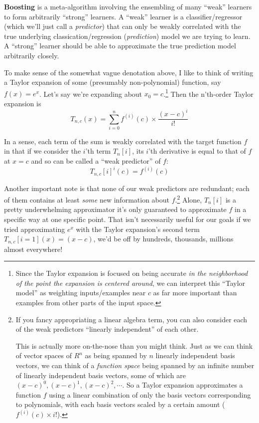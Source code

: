 \documentclass[letterpaper,12pt]{report}
\begin{document}
\textbf{Boosting} is a meta-algorithm involving
the ensembling of many ``weak'' learners to form arbitrarily ``strong'' learners.
A ``weak'' learner is a classifier/regressor (which we'll just call a \emph{predictor}) 
that can only be weakly correlated with the true underlying 
classication/regression (\emph{prediction}) model we are trying to 
learn. A ``strong'' learner should be able to approximate the true prediction model
arbitrarily closely.

To make sense of the somewhat vague denotation above, 
I like to think of writing a Taylor expansion of some (presumably non-polynomial)
function, say \(f(x) = e^x\). Let's say we're expanding about \(x_0 = c\).\footnote{
  Since the Taylor expansion is focused on being accurate
  \emph{in the neighborhood of the point the expansion is centered around}, 
  we can interpret this ``Taylor model'' as weighting inputs/examples near \(c\) 
  as far more important than examples from other parts of the input space.
} 
Then the n'th-order Taylor expansion is
\[ T_{n,c}(x) = \sum_{i=0}^{n} f^{(i)}(c) \times \frac{(x-c)^i}{i!}\]

In a sense, each term of the sum is weakly correlated with the target function $f$ in that
if we consider the \(i\)'th term \(T_n[i]\), its \(i\)'th derivative is equal to 
that of \(f\) at \(x = c\) and so can be called a ``weak predictor'' of \(f\):
\[T_{n,c}[i]^{{i}}(c) = f^{(i)}(c) \]

Another important note is that none of our weak predictors are redundant; each of them
contains at least \emph{some} new information about \(f\).\footnote{
  If you fancy appropriating a linear algebra term, you can also consider each of the weak
  predictors ``linearly independent'' of each other. 

  This is actually more on-the-nose than
  you might think. Just as we can think of vector spaces of \(R^n\) as being spanned by
  \(n\) linearly independent basis vectors, we can think of a 
  \emph{function space} being
  spanned by an infinite number of linearly independent basis vectors, some of which
  are \((x-c)^0, (x-c)^1, (x-c)^2, \cdots\). 
  So a Taylor expansion approximates a function \(f\) using a linear combination of
  only the basis vectors corresponding to polynomials, with each basis vectors scaled 
  by a certain amount (\(f^{(i)}(c) \times {i!}\)).
}
Alone, \(T_n[i]\) is a pretty underwhelming approximator \textendash{} it's only guaranteed to
approximate \(f\) in a specific way at one specific point. 
That isn't necessarily useful for our goals \textemdash{}
if we tried approximating \(e^x\) with the Taylor expansion's second term
\(T_{n,c}[i = 1](x) = (x - c)\), we'd be off by hundreds, thousands, millions almost everywhere!
\end{document}
